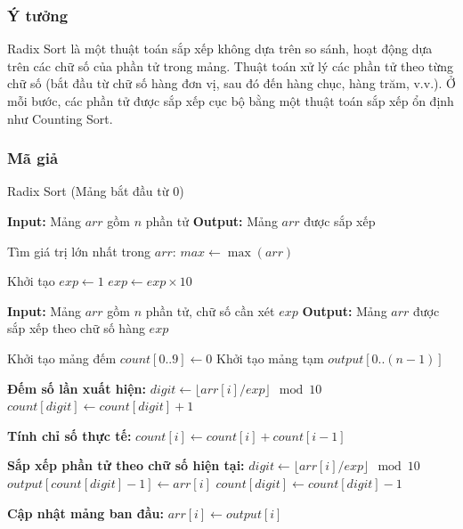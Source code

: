 \subsubsection{Ý tưởng}
Radix Sort là một thuật toán sắp xếp không dựa trên so sánh, hoạt động dựa trên các chữ số của phần tử trong mảng. Thuật toán xử lý các phần tử theo từng chữ số (bắt đầu từ chữ số hàng đơn vị, sau đó đến hàng chục, hàng trăm, v.v.). Ở mỗi bước, các phần tử được sắp xếp cục bộ bằng một thuật toán sắp xếp ổn định như Counting Sort. \cite{drozdek2023}

\subsubsection{Mã giả}

\begin{algorithm}[H]
\caption{Radix Sort (Mảng bắt đầu từ 0)}
\begin{algorithmic}[1]
    \State \textbf{Input:} Mảng $arr$ gồm $n$ phần tử
    \State \textbf{Output:} Mảng $arr$ được sắp xếp
    
    \State Tìm giá trị lớn nhất trong $arr$: $max \gets \max(arr)$
    
    \State Khởi tạo $exp \gets 1$ 
        \State {} 
        \State $exp \gets exp \times 10$
    \EndWhile
\EndProcedure

    \State \textbf{Input:} Mảng $arr$ gồm $n$ phần tử, chữ số cần xét $exp$
    \State \textbf{Output:} Mảng $arr$ được sắp xếp theo chữ số hàng $exp$
    
    \State Khởi tạo mảng đếm $count[0..9] \gets 0$
    \State Khởi tạo mảng tạm $output[0..(n-1)]$
    
    \State \textbf{Đếm số lần xuất hiện:}
        \State $digit \gets \lfloor arr[i] / exp \rfloor \mod 10$
        \State $count[digit] \gets count[digit] + 1$
    \EndFor
    
    \State \textbf{Tính chỉ số thực tế:}
        \State $count[i] \gets count[i] + count[i-1]$
    \EndFor
    
    \State \textbf{Sắp xếp phần tử theo chữ số hiện tại:}
        \State $digit \gets \lfloor arr[i] / exp \rfloor \mod 10$
        \State $output[count[digit] - 1] \gets arr[i]$
        \State $count[digit] \gets count[digit] - 1$
    \EndFor
    
    \State \textbf{Cập nhật mảng ban đầu:}
        \State $arr[i] \gets output[i]$
    \EndFor
\EndProcedure
\end{algorithmic}
\end{algorithm}

